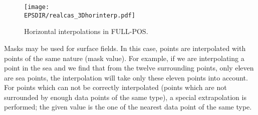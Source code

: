 \begin{figure}[!ht]
\centerline{\texttt{[image: \\EPSDIR/realcas\_3Dhorinterp.pdf]}}
\caption{Horizontal interpolations in FULL-POS.
\label{3Dhorinterp}}
\end{figure}

Masks may be used for surface fields. In this case, points are interpolated with
points of the same nature (mask value). For example, if we are interpolating a
point in the sea and we find that from the twelve surrounding points, only eleven
are sea points, the interpolation will take only these eleven points into account.
\\
For points which can not be correctly interpolated (points which are not surrounded
by enough data points of the same type), a special extrapolation is performed; the
given value is the one of the nearest data point of the same type.

